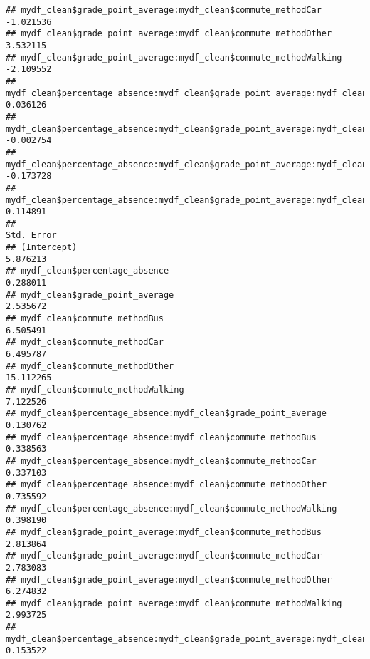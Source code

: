 \documentclass[
]{article}
\begin{document}
\begin{verbatim}
## mydf_clean$grade_point_average:mydf_clean$commute_methodCar                                    -1.021536
## mydf_clean$grade_point_average:mydf_clean$commute_methodOther                                   3.532115
## mydf_clean$grade_point_average:mydf_clean$commute_methodWalking                                -2.109552
## mydf_clean$percentage_absence:mydf_clean$grade_point_average:mydf_clean$commute_methodBus       0.036126
## mydf_clean$percentage_absence:mydf_clean$grade_point_average:mydf_clean$commute_methodCar      -0.002754
## mydf_clean$percentage_absence:mydf_clean$grade_point_average:mydf_clean$commute_methodOther    -0.173728
## mydf_clean$percentage_absence:mydf_clean$grade_point_average:mydf_clean$commute_methodWalking   0.114891
##                                                                                               Std. Error
## (Intercept)                                                                                     5.876213
## mydf_clean$percentage_absence                                                                   0.288011
## mydf_clean$grade_point_average                                                                  2.535672
## mydf_clean$commute_methodBus                                                                    6.505491
## mydf_clean$commute_methodCar                                                                    6.495787
## mydf_clean$commute_methodOther                                                                 15.112265
## mydf_clean$commute_methodWalking                                                                7.122526
## mydf_clean$percentage_absence:mydf_clean$grade_point_average                                    0.130762
## mydf_clean$percentage_absence:mydf_clean$commute_methodBus                                      0.338563
## mydf_clean$percentage_absence:mydf_clean$commute_methodCar                                      0.337103
## mydf_clean$percentage_absence:mydf_clean$commute_methodOther                                    0.735592
## mydf_clean$percentage_absence:mydf_clean$commute_methodWalking                                  0.398190
## mydf_clean$grade_point_average:mydf_clean$commute_methodBus                                     2.813864
## mydf_clean$grade_point_average:mydf_clean$commute_methodCar                                     2.783083
## mydf_clean$grade_point_average:mydf_clean$commute_methodOther                                   6.274832
## mydf_clean$grade_point_average:mydf_clean$commute_methodWalking                                 2.993725
## mydf_clean$percentage_absence:mydf_clean$grade_point_average:mydf_clean$commute_methodBus       0.153522

\end{verbatim}
\end{document}
